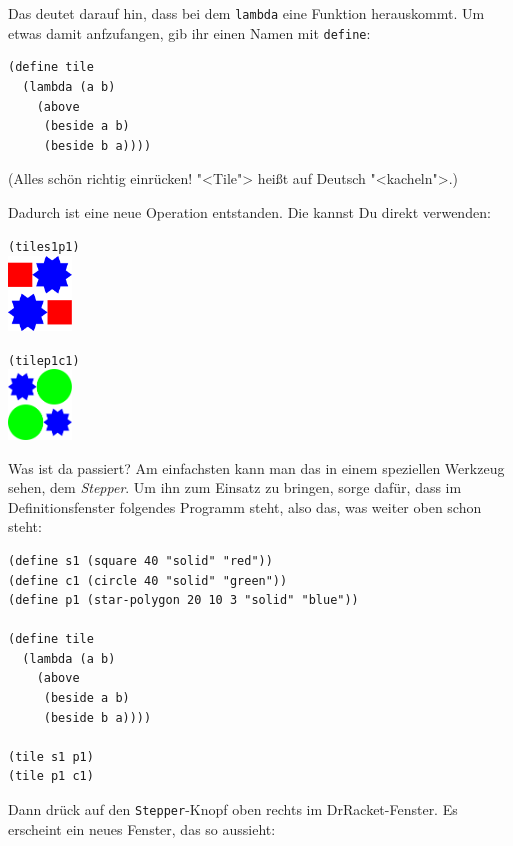 Das deutet darauf hin, dass bei dem \texttt{lambda} eine Funktion
herauskommt.  Um etwas damit anfzufangen, gib ihr einen Namen mit
\texttt{define}:
%
\begin{verbatim}
(define tile
  (lambda (a b)
    (above
     (beside a b)
     (beside b a))))
\end{verbatim}
%
(Alles schön richtig einrücken! "<Tile"> heißt auf Deutsch
"<kacheln">.)

Dadurch ist eine neue Operation entstanden.  Die kannst Du direkt
verwenden:
%
\begin{alltt}
(tile s1 p1)
\evalsto{} \includegraphics[width=48pt]{i1prog/tile1}

(tile p1 c1)
\evalsto{} \includegraphics[width=48pt]{i1prog/tile2}
\end{alltt}
%
Was ist da passiert?  Am einfachsten kann man das in einem speziellen
Werkzeug sehen, dem \textit{Stepper}.  Um ihn zum
Einsatz zu bringen, sorge dafür, dass im Definitionsfenster folgendes
Programm steht, also das, was weiter oben schon steht:
%
\begin{verbatim}
(define s1 (square 40 "solid" "red"))
(define c1 (circle 40 "solid" "green"))
(define p1 (star-polygon 20 10 3 "solid" "blue"))

(define tile
  (lambda (a b)
    (above
     (beside a b)
     (beside b a))))

(tile s1 p1)
(tile p1 c1)
\end{verbatim}
%
Dann drück auf den \texttt{Stepper}-Knopf oben rechts im
DrRacket-Fenster.  Es erscheint ein neues Fenster, das so aussieht:

